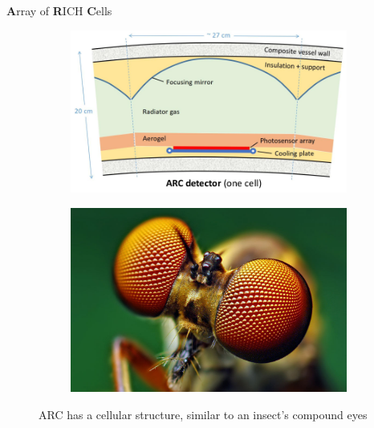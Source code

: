 \documentclass{beamer}
\begin{document}
\begin{frame}{\textbf{A}rray of \textbf{R}ICH \textbf{C}ells}
\begin{figure}
\begin{subfigure}{0.4\textwidth}
      \includegraphics[width = 1.0\textwidth]{Plots/ARC_Cell.png}
    \end{subfigure}%
    \hspace{1cm}
    \begin{subfigure}{0.3\textwidth}
      \includegraphics[width = 1.0\textwidth]{Plots/CompoundEyes.jpg}
    \end{subfigure}
    \caption{ARC has a cellular structure, similar to an insect's compound eyes}
  \end{figure}
\end{frame}
\end{document}
